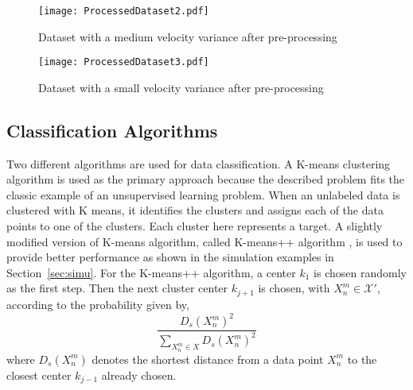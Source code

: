 \documentclass[letterpaper, 10 pt, conference]{ieeeconf}
\begin{document}
\begin{figure}[h!]
\centering
\captionsetup{justification=centering}
\texttt{[image: ProcessedDataset2.pdf]}
\caption{Dataset with a medium velocity variance after pre-processing}
\label{fig:ProcessedDataset2}
\end{figure}


\begin{figure}[h!]
\centering
\captionsetup{justification=centering}
\texttt{[image: ProcessedDataset3.pdf]}
\caption{Dataset with a small velocity variance after pre-processing}
\label{fig:ProcessedDataset3}
\end{figure}



\subsection{Classification Algorithms}
Two different algorithms are used for data classification. A K-means clustering algorithm is used as the primary approach because the described problem fits the classic example of an unsupervised learning problem. When an unlabeled data is clustered with K means, it identifies the clusters and assigns each of the data points to one of the clusters. Each cluster here represents a target. A slightly modified version of K-means algorithm, called K-means++ algorithm \cite{arthur2007k}, is used to provide better performance as shown in the simulation examples in Section~\ref{sec:simu}. For the K-means++ algorithm, a center $k_1$ is chosen randomly as the first step. Then the next cluster center $k_{j+1}$ is chosen, with $ X_n^m \in \mathcal{X}'$, according to the probability given by, 
\begin{equation} \label{eq:Kmns++Probability}
\frac{D_s(X_n^m)^2}{\sum_{X_n^m \in X}D_s(X_n^m)^2}
\end{equation}
where $D_s(X_n^m)$ denotes the shortest distance from a data point $X_n^m$ to the closest center $k_{j-1}$ already chosen.
\end{document}
